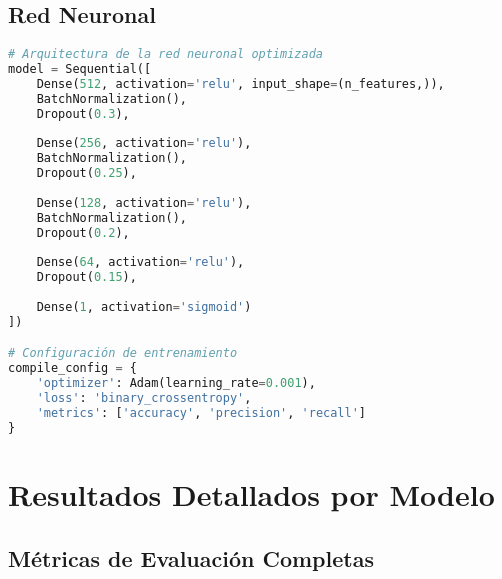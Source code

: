 \subsection{Red Neuronal}
\label{subsec:config_nn}

\begin{lstlisting}[language=Python, caption=Arquitectura de Red Neuronal]
# Arquitectura de la red neuronal optimizada
model = Sequential([
    Dense(512, activation='relu', input_shape=(n_features,)),
    BatchNormalization(),
    Dropout(0.3),
    
    Dense(256, activation='relu'),
    BatchNormalization(),
    Dropout(0.25),
    
    Dense(128, activation='relu'),
    BatchNormalization(),
    Dropout(0.2),
    
    Dense(64, activation='relu'),
    Dropout(0.15),
    
    Dense(1, activation='sigmoid')
])

# Configuración de entrenamiento
compile_config = {
    'optimizer': Adam(learning_rate=0.001),
    'loss': 'binary_crossentropy',
    'metrics': ['accuracy', 'precision', 'recall']
}
\end{lstlisting}


\section{Resultados Detallados por Modelo}
\label{sec:resultados_detallados}

\subsection{Métricas de Evaluación Completas}
\label{subsec:metricas_completas}

